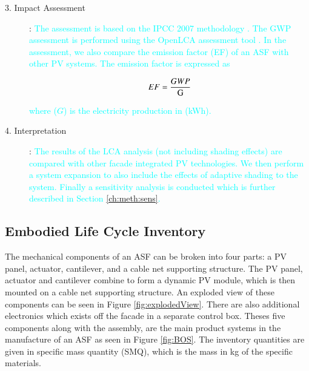 \begin{description}
\item[3. Impact Assessment]: \textcolor{cyan}{The assessment is based on the IPCC 2007 methodology \cite{solomon2007climate}. The GWP assessment is performed using the OpenLCA assessment tool \cite{ciroth2007ict}. In the assessment, we also compare the emission factor (EF) of an ASF with other PV systems. The emission factor is expressed as}

\begin{equation}
EF=\frac{GWP}{\mathrm{G}}   
\tagaddtext{[$\frac{kg CO_{2-eq}}{kWh}$]}
\label{eq:EF}
\end{equation}

\textcolor{cyan}{where ($G$) is the electricity production in (kWh).}


\item[4. Interpretation]: \textcolor{cyan}{The results of the LCA analysis (not including shading effects) are compared with other facade integrated PV technologies. We then perform a system expansion to also include the effects of adaptive shading to the system. Finally a sensitivity analysis is conducted which is further described in Section \ref{ch:meth:sens}.}


\end{description}

\subsection{Embodied Life Cycle Inventory}
\label{ch:meth:Embodied}



The mechanical components of an ASF can be broken into four parts: a PV panel, actuator, cantilever, and a cable net supporting structure. The PV panel, actuator and cantilever combine to form a dynamic PV module, which is then mounted on a cable net supporting structure. An exploded view of these components can be seen in Figure \ref{fig:explodedView}. There are also additional electronics which exists off the facade in a separate control box. Theses five components along with the assembly, are the main product systems in the manufacture of an ASF as seen in Figure \ref{fig:BOS}. The inventory quantities are given in specific mass quantity (SMQ), which is the mass in kg of the specific materials.



